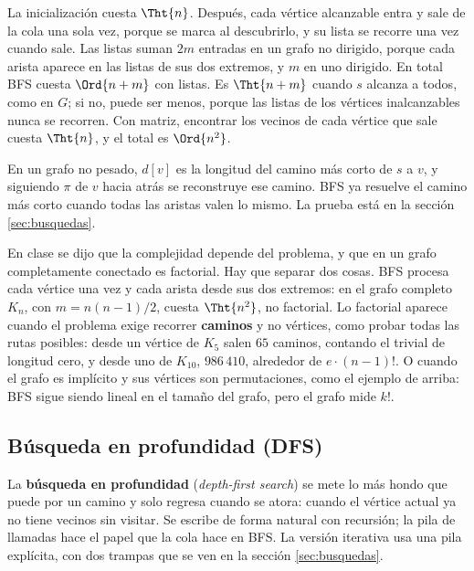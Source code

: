 \documentclass[11pt,letterpaper]{article}
\begin{document}
La inicialización cuesta $\Tht{n}$. Después, cada vértice alcanzable
entra y sale de la cola una sola vez, porque se marca al descubrirlo,
y su lista se recorre una vez cuando sale. Las listas suman $2m$
entradas en un grafo no dirigido, porque cada arista aparece en las
listas de sus dos extremos, y $m$ en uno dirigido. En total BFS cuesta
$\Ord{n + m}$ con listas. Es $\Tht{n + m}$ cuando $s$ alcanza a todos,
como en $G$; si no, puede ser menos, porque las listas de los
vértices inalcanzables nunca se recorren. Con matriz, encontrar los
vecinos de cada vértice que sale cuesta $\Tht{n}$, y el total es
$\Ord{n^2}$.

\begin{idea}
  En un grafo no pesado, $d[v]$ es la longitud del camino más corto de
  $s$ a $v$, y siguiendo $\pi$ de $v$ hacia atrás se reconstruye ese
  camino. BFS ya resuelve el camino más corto cuando todas las aristas
  valen lo mismo. La prueba está en la sección \ref{sec:busquedas}.
\end{idea}

\begin{ojo}
  En clase se dijo que la complejidad depende del problema, y que en un
  grafo completamente conectado es factorial. Hay que separar dos
  cosas. BFS procesa cada vértice una vez y cada arista desde sus dos
  extremos: en el grafo completo $K_n$, con $m = n(n-1)/2$, cuesta
  $\Tht{n^2}$, no factorial. Lo factorial aparece cuando el problema
  exige recorrer \textbf{caminos} y no vértices, como probar todas las
  rutas posibles: desde un vértice de $K_5$ salen $65$ caminos,
  contando el trivial de longitud cero, y desde uno de $K_{10}$,
  $986\,410$, alrededor de $e \cdot (n-1)!$. O cuando el grafo es
  implícito y sus vértices son permutaciones, como el ejemplo de
  arriba: BFS sigue siendo lineal en el tamaño del grafo, pero el
  grafo mide $k!$.
\end{ojo}


\subsection*{Búsqueda en profundidad (DFS)}

La \textbf{búsqueda en profundidad} (\textit{depth-first search}) se
mete lo más hondo que puede por un camino y solo regresa cuando se
atora: cuando el vértice actual ya no tiene vecinos sin visitar. Se
escribe de forma natural con recursión; la pila de llamadas hace el
papel que la cola hace en BFS. La versión iterativa usa una pila
explícita, con dos trampas que se ven en la sección
\ref{sec:busquedas}.
\end{document}
